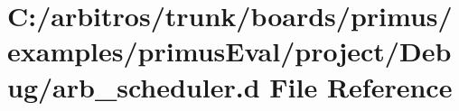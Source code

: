 \hypertarget{boards_2primus_2examples_2primus_eval_2project_2_debug_2arb__scheduler_8d}{\section{C\-:/arbitros/trunk/boards/primus/examples/primus\-Eval/project/\-Debug/arb\-\_\-scheduler.d File Reference}
\label{boards_2primus_2examples_2primus_eval_2project_2_debug_2arb__scheduler_8d}
}
